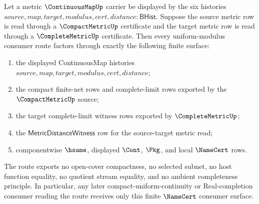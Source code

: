 \begin{theorem}
\label{thm:continuousmap-compact-complete-uniform-route-sharpening}
Let a metric $\ContinuousMapUp$ carrier be displayed by the six histories
$source,map,target,modulus,cert,distance:\mathsf{BHist}$. Suppose the source
metric row is read through a $\CompactMetricUp$ certificate and the target
metric row is read through a $\CompleteMetricUp$ certificate. Then every
uniform-modulus consumer route factors through exactly the following finite
surface:
\begin{enumerate}
  \item the displayed ContinuousMap histories
  $source,map,target,modulus,cert,distance$;
  \item the compact finite-net rows and complete-limit rows exported by the
  $\CompactMetricUp$ source;
  \item the target complete-limit witness rows exported by
  $\CompleteMetricUp$;
  \item the $\mathsf{MetricDistanceWitness}$ row for the source-target metric
  read;
  \item componentwise $\hsame$, displayed $\Cont$, $\Pkg$, and local
  $\NameCert$ rows.
\end{enumerate}
The route exports no open-cover compactness, no selected subnet, no host
function equality, no quotient stream equality, and no ambient completeness
principle. In particular, any later compact-uniform-continuity or
Real-completion consumer reading the route receives only this finite
$\NameCert$ consumer surface.
\end{theorem}
